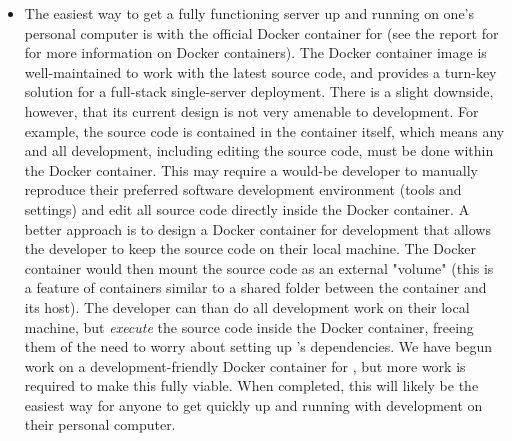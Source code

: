 \documentclass{deliverablereport}
\renewcommand{\SMC}{\software{SMC}}
\begin{document}
\begin{itemize}
    \item The easiest way to get a fully functioning \SMC server up and running
        on one's personal computer is with the official Docker container for
        \SMC (see the report for
         for more
        information on Docker containers).  The Docker container image is
        well-maintained to work with the latest \SMC source code, and provides
        a turn-key solution for a full-stack single-server \SMC deployment.
        There is a slight downside, however, that its current design is not
        very amenable to development.  For example, the \SMC source code is
        contained in the container itself, which means any and all development,
        including editing the source code, must be done within the Docker
        container.  This may require a would-be developer to manually reproduce
        their preferred software development environment (tools and settings)
        and edit all source code directly inside the Docker container.  A
        better approach is to design a Docker container for development that
        allows the developer to keep the \SMC source code on their local
        machine.  The \SMC Docker container would then mount the source code as
        an external "volume" (this is a feature of containers similar to a
        shared folder between the container and its host).  The developer can
        than do all development work on their local machine, but \emph{execute}
        the source code inside the Docker container, freeing them of the need
        to worry about setting up \SMC's dependencies.  We have begun work on a
        development-friendly Docker container for \SMC, but more work is
        required to make this fully viable.  When completed, this will likely
        be the easiest way for anyone to get quickly up and running with \SMC
        development on their personal computer.

\end{itemize}
\end{document}

